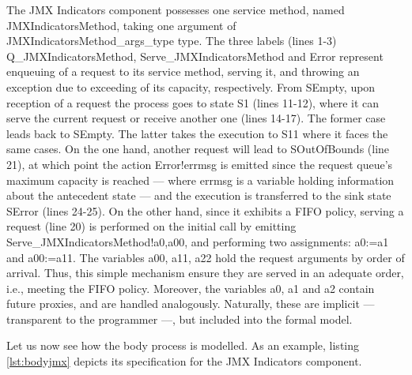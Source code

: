 		
			

			
	\noindent The \textsf{JMX Indicators} component possesses one service method, named
	\textsf{JMXIndicatorsMethod}, taking one argument of \textsf{JMXIndicatorsMethod\_args\_type}
	type. The three labels (lines 1-3) \textsf{Q\_JMXIndicatorsMethod}, \textsf{Serve\_JMXIndicatorsMethod} 
	and \textsf{Error} represent enqueuing of a request to its service method, 
	serving it, and throwing an exception due to exceeding of its capacity, 
	respectively. From \textsf{SEmpty}, upon reception of a request
	the process goes to state \textsf{S1} (lines 11-12), where it can serve the current request
	or receive another one (lines 14-17). The former case leads back 
	to \textsf{SEmpty}. The latter
	takes the execution to \textsf{S11} where it faces the same cases. 
	On the one hand, another request
	will lead to \textsf{SOutOfBounds} (line 21), at which point 
	the action \textsf{Error!errmsg} is emitted since 
	the request queue's maximum capacity is reached 
	--- where \textsf{errmsg} is a variable holding
	information about the antecedent state --- 
	and the execution is transferred to the sink state \textsf{SError} (lines 24-25). 
	On the other hand, since it exhibits a \ac{FIFO} policy, serving a request (line 20) 
	is performed on the initial call by emitting \textsf{Serve\_JMXIndicatorsMethod!a0,a00},
	and performing two assignments: \textsf{a0:=a1} and \textsf{a00:=a11}. The variables
	\textsf{a00}, \textsf{a11}, \textsf{a22} hold the request arguments by order of arrival. Thus, 
	this simple mechanism ensure they are served in an adequate order, i.e., 
	meeting the \ac{FIFO} policy. Moreover, the variables \textsf{a0}, \textsf{a1} and \textsf{a2}
	contain future proxies, and are handled analogously. Naturally, these are implicit --- transparent
	to the programmer ---, but included into the formal model.

		Let us now see how the \textsf{body} process is modelled. As an example, listing \ref{lst:bodyjmx} 
		depicts its specification for the \textsf{JMX Indicators} component.

					
		
